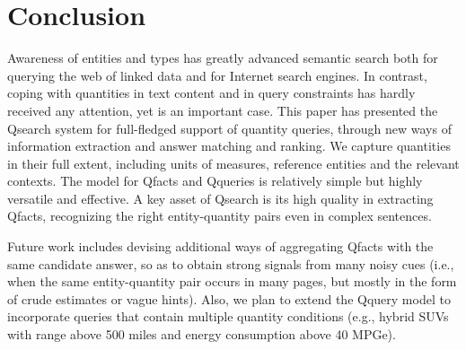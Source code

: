 

\section{Conclusion}
%

Awareness of entities and types has greatly advanced semantic search
both for querying the web of linked data and for Internet search engines.
In contrast, coping with quantities in text content and in query constraints
has hardly received any attention, yet is an important case.
This paper has presented the Qsearch system for full-fledged support of
quantity queries, through new ways of information extraction and 
answer matching and ranking.
We capture quantities in their full extent, including units of measures,
reference entities and the relevant contexts.
The model for Qfacts and Qqueries is relatively simple but highly versatile and effective.
A key asset of Qsearch is its high quality in extracting Qfacts,
recognizing the right entity-quantity pairs even in complex sentences.

Future work includes devising additional ways of aggregating Qfacts with
the same candidate answer, so as to obtain strong signals from many
noisy cues (i.e., when the same entity-quantity pair occurs in many pages,
but mostly in the form of crude estimates or vague hints).
Also, we plan to extend the Qquery model to incorporate queries that
contain multiple quantity conditions (e.g., hybrid SUVs with range above 500 miles
and energy consumption above 40 MPGe).




